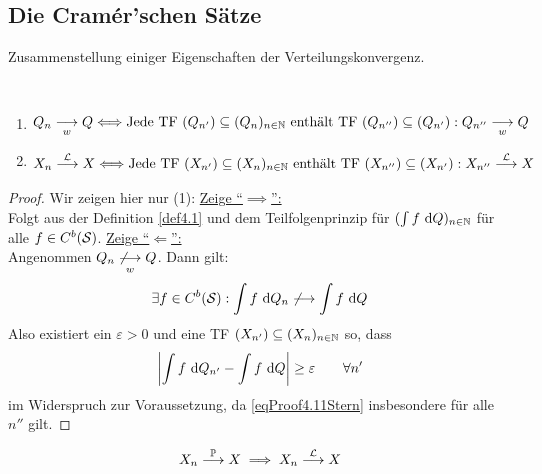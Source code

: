 \subsection*{Die Cramér'schen Sätze}
Zusammenstellung einiger Eigenschaften der Verteilungskonvergenz.

\begin{satz}\label{satz4.11}\
	\begin{enumerate}[label=(\arabic*)]
		\item $\begin{aligned}
			Q_n\stackrelnew{w}{}{\longrightarrow} Q
			\Longleftrightarrow
			\text{Jede TF }(Q_{n'})\subseteq(Q_n)_{n\in\N}\text{ enthält TF }(Q_{n''})\subseteq(Q_{n'}):Q_{n''}\stackrelnew{w}{}{\longrightarrow} Q
		\end{aligned}$
		\item $\begin{aligned}
			X_n\stackrel{\L}{\longrightarrow} X\Longleftrightarrow\text{Jede TF }(X_{n'})\subseteq(X_n)_{n\in\N}\text{ enthält TF }(X_{n''})\subseteq(X_{n'}):X_{n''}\stackrel{\L}{\longrightarrow} X
		\end{aligned}$
	\end{enumerate}
\end{satz}

\begin{proof}
	Wir zeigen hier nur (1):\nl
	\underline{Zeige ``$\implies$'':}\\
	Folgt aus der Definition \ref{def4.1} und dem Teilfolgenprinzip für $(\int f\d Q)_{n\in\N}$ für alle $f\in C^b(\S)$.\nl
	\underline{Zeige ``$\Longleftarrow$'':}\\
	Angenommen $Q_n\stackrelnew{w}{}{\not\longrightarrow} Q$. 
	Dann gilt:
	\begin{align*}
		\exists f\in C^b(\S):\int\limits f\d Q_n\not\longrightarrow\int\limits f\d Q
	\end{align*}
	Also existiert ein $\varepsilon>0$ und eine TF $(X_{n'})\subseteq(X_n)_{n\in\N}$ so, dass
	\begin{align}\label{eqProof4.11Stern}
		\left|\int\limits f\d Q_{n'}-\int\limits f\d Q\right|\geq\varepsilon\qquad\forall n'
	\end{align}
	im Widerspruch zur Voraussetzung, da \eqref{eqProof4.11Stern} insbesondere für alle $n''$ gilt.
\end{proof}

\begin{satz}\label{satz4.12}
	\begin{align*}
		X_n\stackrel{\P}{\longrightarrow} X\implies X_n\stackrel{\L}{\longrightarrow} X
	\end{align*}
\end{satz}

